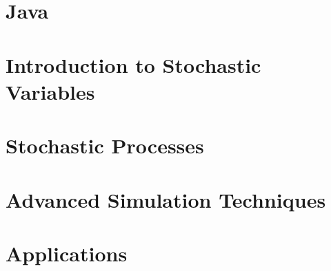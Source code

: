 \documentclass[fleqn,10pt,a4paper,openright, draft]{book}
\begin{document}



\setcounter{chapter}{-1}

\lstset{language=java,basicstyle=\small,stringstyle=\ttfamily}

\part{Java}





\part{Introduction to Stochastic Variables}





\part{Stochastic Processes}




\part{Advanced Simulation Techniques}





\part{Applications}




\appendix




 
\end{document}
